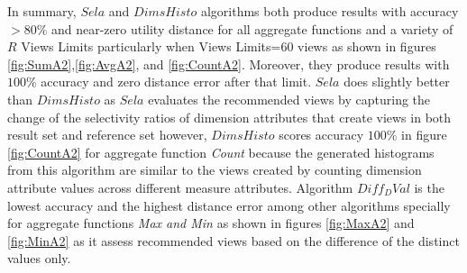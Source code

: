 In summary, $Sela$ and $DimsHisto$ algorithms both produce results with accuracy $>80\%$ and near-zero utility
distance for all aggregate functions and a variety of $R$ Views Limits particularly when Views Limits=60 views as shown in figures \ref{fig:SumA2},\ref{fig:AvgA2}, and \ref{fig:CountA2}. Moreover, they produce results with $100\%$ accuracy and zero distance error after that limit. $Sela$ does slightly better than $DimsHisto$ as $Sela$ evaluates the recommended views by capturing the change of the selectivity ratios of dimension attributes that create views in both result set and reference set however, $DimsHisto$ scores accuracy $100\%$ in figure \ref{fig:CountA2} for aggregate function \emph{Count} because the generated histograms from this algorithm are similar to the views created by counting dimension attribute values across different measure attributes. Algorithm $Diff_DVal$ is the lowest accuracy and the highest distance error among other algorithms specially for aggregate functions \emph{Max and Min} as shown in figures \ref{fig:MaxA2} and \ref{fig:MinA2} as it assess recommended views based on the difference of the distinct values only. 

